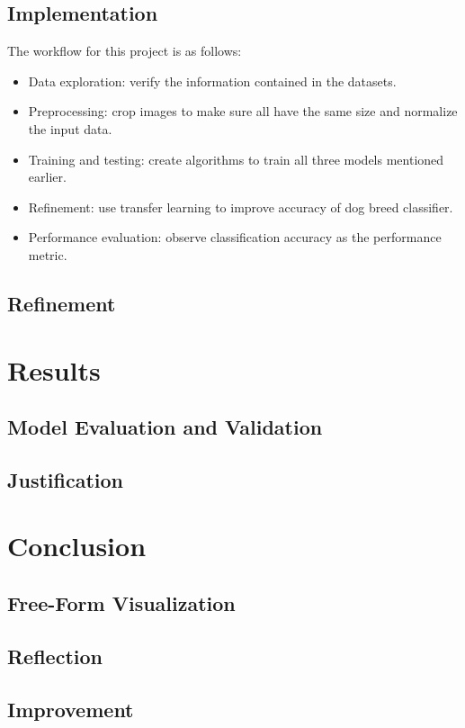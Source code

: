 \documentclass{article}
\begin{document}
    \subsection{Implementation}

    The workflow for this project is as follows:

    \begin{itemize}
        \item Data exploration: verify the information contained in the datasets.
        \item Preprocessing: crop images to make sure all have the same size and normalize the input data.
        \item Training and testing: create algorithms to train all three models mentioned earlier.
        \item Refinement: use transfer learning to improve accuracy of dog breed classifier.
        \item Performance evaluation: observe classification accuracy as the performance metric.
    \end{itemize}

    \subsection{Refinement}

    \section{Results}

    \subsection{Model Evaluation and Validation}

    \subsection{Justification}

    \section{Conclusion}

    \subsection{Free-Form Visualization}

    \subsection{Reflection}

    \subsection{Improvement}
\end{document}
